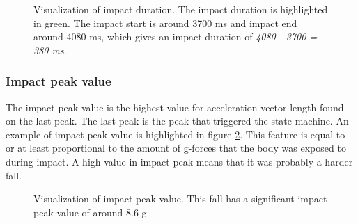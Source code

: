 \documentclass[12pt, a4paper, onecolumn]{article}
\begin{document}
	\begin{figure}[H]
		\centering
		\caption{Visualization of impact duration. The impact duration is highlighted in green. The impact start is around 3700 ms and impact end around 4080 ms, which gives an impact duration of \textit{4080 - 3700 = 380 ms}.}%
		\label{fig:fall-data-impact-duration}%
	\end{figure}
	
	\subsubsection{Impact peak value}
	
	The impact peak value is the highest value for acceleration vector length found on the last peak. The last peak is the peak that triggered the state machine. An example of impact peak value is highlighted in figure \ref{fig:fall-data-impact-peak}. This feature is equal to or at least proportional to the amount of g-forces that the body was exposed to during impact. A high value in impact peak means that it was probably a harder fall.
	
	\begin{figure}[H]
		\centering
		\caption{Visualization of impact peak value. This fall has a significant impact peak value of around 8.6 g}%
		\label{fig:fall-data-impact-peak}%
	\end{figure}
	
\end{document}
